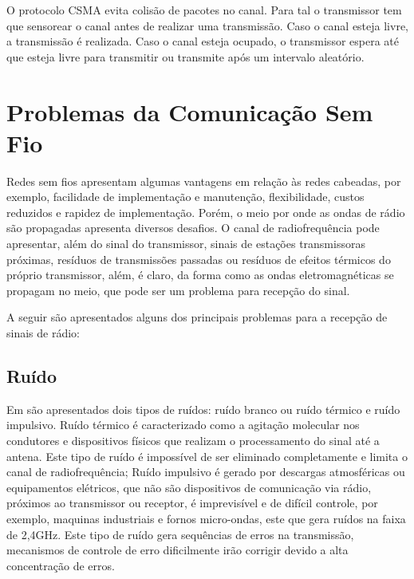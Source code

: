 O protocolo CSMA evita colisão de pacotes no canal. Para tal o transmissor tem que sensorear o canal antes de realizar uma transmissão. Caso o canal esteja livre, a transmissão é realizada. Caso o canal esteja ocupado, o transmissor espera até que esteja livre para transmitir ou transmite após um intervalo aleatório.


\section{Problemas da Comunicação Sem Fio}
Redes sem fios apresentam algumas vantagens em relação às redes cabeadas, por exemplo, facilidade de implementação e manutenção, flexibilidade, custos reduzidos e rapidez de implementação. Porém, o meio por onde as ondas de rádio são propagadas apresenta diversos desafios. O canal de radiofrequência pode apresentar, além do sinal do transmissor, sinais de estações transmissoras próximas, resíduos de transmissões passadas ou resíduos de efeitos térmicos do próprio transmissor, além, é claro, da forma como as ondas eletromagnéticas se propagam no meio, que pode ser um problema para recepção do sinal.

A seguir são apresentados alguns dos principais problemas para a recepção de sinais de rádio:

\subsection*{Ruído}
Em \cite{rochol2018sistemas} são apresentados dois tipos de ruídos: ruído branco ou ruído térmico e ruído impulsivo. Ruído térmico é caracterizado como a agitação molecular nos condutores e dispositivos físicos que realizam o processamento do sinal até a antena. Este tipo de ruído é impossível de ser eliminado completamente e limita o canal de radiofrequência; Ruído impulsivo é gerado por descargas atmosféricas ou equipamentos elétricos, que não são dispositivos de comunicação via rádio, próximos ao transmissor ou receptor, é imprevisível e de difícil controle, por exemplo, maquinas industriais e fornos micro-ondas, este que gera ruídos na faixa de 2,4GHz. Este tipo de ruído gera sequências de erros na transmissão, mecanismos de controle de erro dificilmente irão corrigir devido a alta concentração de erros.

